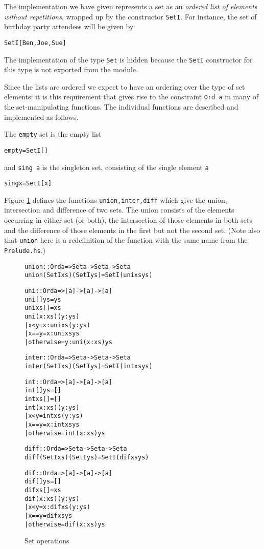 \documentclass[11pt]{article}
\begin{document}
The implementation we have given represents a set as an {\em ordered list of
elements without repetitions}, wrapped up by the constructor \texttt{SetI}.
For instance, the set of birthday party attendees will be given by
\begin{alltt}
SetI [Ben,Joe,Sue]
\end{alltt}
The implementation of the type \texttt{Set} is hidden because the \texttt{SetI}
constructor for this type is not exported from the module.

Since the lists are ordered we expect to have an 
ordering over the type of set elements; it is this requirement that gives rise to
the constraint \texttt{Ord a} in many of the set-manipulating functions.
The individual functions are described and
implemented as follows.

\medskip
\noindent
The {\tt empty} set is the empty list
\begin{alltt}
empty = SetI []
\end{alltt}
and {\tt sing a} is the singleton set, consisting of the single element {\tt a}
\begin{alltt}
sing x = SetI [x]
\end{alltt}
Figure \ref{setOps} defines the functions
{\tt union,inter,diff} which give the union, intersection and difference of two
sets. The union consists of the elements occurring in either set (or both), the
intersection of those elements in both sets and the difference of those
elements in the first but not the second set. (Note also that \texttt{union} here is a redefinition of the 
function with the same name from the \texttt{Prelude.hs}.) 

\begin{figure}
\begin{alltt}
union :: Ord a => Set a -> Set a -> Set a
union (SetI xs) (SetI ys) = SetI (uni xs ys)

uni :: Ord a => [a] -> [a] -> [a]
uni [] ys        = ys
uni xs []        = xs
uni (x:xs) (y:ys) 
  | x<y         = x : uni xs (y:ys)
  | x==y        = x : uni xs ys
  | otherwise   = y : uni (x:xs) ys

inter :: Ord a => Set a -> Set a -> Set a
inter (SetI xs) (SetI ys) = SetI (int xs ys)

int :: Ord a => [a] -> [a] -> [a]
int [] ys       = []
int xs []       = []
int (x:xs) (y:ys) 
  | x<y         = int xs (y:ys)
  | x==y        = x : int xs ys
  | otherwise   = int (x:xs) ys

diff :: Ord a => Set a -> Set a -> Set a
diff (SetI xs) (SetI ys) = SetI (dif xs ys)

dif :: Ord a => [a] -> [a] -> [a]
dif [] ys       = []
dif xs []       = xs
dif (x:xs) (y:ys)  
  | x<y         = x : dif xs (y:ys)
  | x==y        = dif xs ys
  | otherwise   = dif (x:xs) ys
\end{alltt}
\caption{Set operations}
\label{setOps}
\end{figure}
\end{document}
